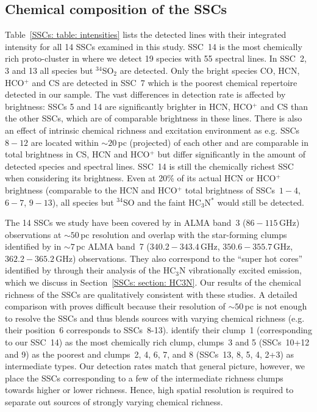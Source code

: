 \subsection{Chemical composition of the SSCs}

Table~\ref{SSCs: table: intensities} lists the detected lines with their integrated intensity for all 14 SSCs examined in this study.
SSC~14 is the most chemically rich proto-cluster in  where we detect 19 species with 55 spectral lines. In SSC~2, 3 and 13 all species but $^{34}$SO$_2$ are detected. Only the bright species CO, HCN, HCO$^+$ and CS are detected in SSC~7 which is the poorest chemical repertoire detected in our sample.
The vast differences in detection rate is affected by brightness: SSCs 5 and 14 are significantly brighter in HCN, HCO$^+$ and CS than the other SSCs, which are of comparable brightness in these lines. There is also an effect of intrinsic chemical richness and excitation environment as e.g. SSCs $8-12$ are located within $\sim20$\,pc (projected) of each other and are comparable in total brightness in CS, HCN and HCO$^+$ but differ significantly in the amount of detected species and spectral lines.
SSC~14 is still the chemically richest SSC when considering its brightness. Even at 20\% of its actual HCN or HCO$^+$ brightness (comparable to the HCN and HCO$^+$ total brightness of SSCs~$1-4$, $6-7$, $9-13$), all species but $^{34}$SO and the faint HC$_3$N$^*$ would still be detected.

The 14 SSCs we study have been covered by \citet{2015ApJ...801...63M} in ALMA band~3 ($86-115$\,GHz) observations at $\sim 50$\,pc resolution and overlap with the star-forming clumps identified by \citet{2017ApJ...849...81A} in $\sim 7$\,pc ALMA band~7 ($340.2-343.4$\,GHz, $350.6-355.7$\,GHz, $362.2-365.2$\,GHz) observations. They also correspond to the ``super hot cores'' identified by \citet{2020MNRAS.491.4573R} through their analysis of the HC$_3$N vibrationally excited emission, which we discuss in Section~\ref{SSCs: section: HC3N}. Our results of the chemical richness of the SSCs are qualitatively consistent with these studies. A detailed comparison with \citet{2015ApJ...801...63M} proves difficult because their resolution of $\sim 50$\,pc is not enough to resolve the SSCs and thus blends sources with varying chemical richness (e.g. their position~6 corresponds to SSCs~8-13). \citet{2017ApJ...849...81A} identify their clump~1 (corresponding to our SSC~14) as the most chemically rich clump, clumps~3 and 5 (SSCs~10+12 and 9) as the poorest and clumps~2, 4, 6, 7, and 8 (SSCs~13, 8, 5, 4, 2+3) as intermediate types. Our detection rates match that general picture, however, we place the SSCs corresponding to a few of the intermediate richness clumps towards higher or lower richness. Hence, high spatial resolution is required to separate out sources of strongly varying chemical richness.

